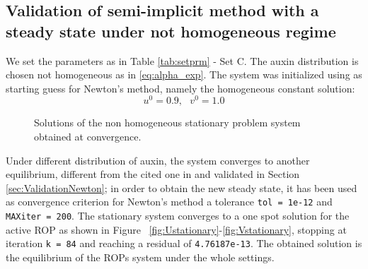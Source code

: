 \subsection{Validation of semi-implicit method with a steady state under not homogeneous regime}\label{sec:ValidationSS_nothom}
We set the parameters as in Table \ref{tab:setprm} - Set C. The auxin distribution is chosen not homogeneous as in \eqref{eq:alpha_exp}. The system was initialized using as starting guess for Newton's method, namely the homogeneous constant solution:
\begin{equation*}
    u^0 = 0.9, \ \ \ v^0 = 1.0
\end{equation*}
\begin{figure}[t]
    \centering
    \quad
    \quad
    \quad
    \caption[Equilibrium for Set C]{Solutions of the non homogeneous stationary problem system obtained at convergence.}
    \label{fig:stationarySol}
\end{figure}
Under different distribution of auxin, the system converges to another equilibrium, different from the cited one in \cite{intra2} and validated in Section \ref{sec:ValidationNewton}; in order to obtain the new steady state, it has been used as convergence criterion for Newton's method a tolerance \verb|tol = 1e-12| and \verb|MAXiter = 200|. The stationary system converges to a one spot solution for the active ROP as shown in Figure~ \ref{fig:Ustationary}-\ref{fig:Vstationary}, stopping at iteration \verb|k = 84| and reaching a residual of \verb|4.76187e-13|. The obtained solution is the equilibrium of the ROPs system under the whole settings.

